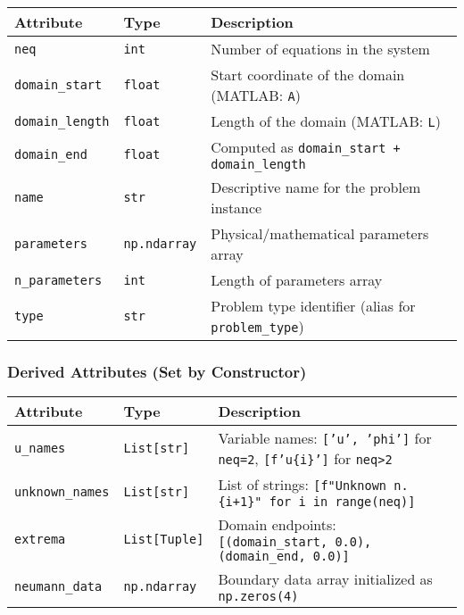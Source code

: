 \begin{longtable}{|p{3.5cm}|p{2.5cm}|p{7cm}|}
\hline
\textbf{Attribute} & \textbf{Type} & \textbf{Description} \\
\hline
\endhead

\texttt{neq} & \texttt{int} & Number of equations in the system \\
\hline

\texttt{domain\_start} & \texttt{float} & Start coordinate of the domain (MATLAB: \texttt{A}) \\
\hline

\texttt{domain\_length} & \texttt{float} & Length of the domain (MATLAB: \texttt{L}) \\
\hline

\texttt{domain\_end} & \texttt{float} & Computed as \texttt{domain\_start + domain\_length} \\
\hline

\texttt{name} & \texttt{str} & Descriptive name for the problem instance \\
\hline

\texttt{parameters} & \texttt{np.ndarray} & Physical/mathematical parameters array \\
\hline

\texttt{n\_parameters} & \texttt{int} & Length of parameters array \\
\hline

\texttt{type} & \texttt{str} & Problem type identifier (alias for \texttt{problem\_type}) \\
\hline

\end{longtable}

\subsubsection{Derived Attributes (Set by Constructor)}

\begin{longtable}{|p{3.5cm}|p{2.5cm}|p{7cm}|}
\hline
\textbf{Attribute} & \textbf{Type} & \textbf{Description} \\
\hline
\endhead

\texttt{u\_names} & \texttt{List[str]} & Variable names: \texttt{['u', 'phi']} for \texttt{neq=2}, \texttt{[f'u\{i\}']} for \texttt{neq>2} \\
\hline

\texttt{unknown\_names} & \texttt{List[str]} & List of strings: \texttt{[f"Unknown n. \{i+1\}" for i in range(neq)]} \\
\hline

\texttt{extrema} & \texttt{List[Tuple]} & Domain endpoints: \texttt{[(domain\_start, 0.0), (domain\_end, 0.0)]} \\
\hline

\texttt{neumann\_data} & \texttt{np.ndarray} & Boundary data array initialized as \texttt{np.zeros(4)} \\
\hline

\end{longtable}

